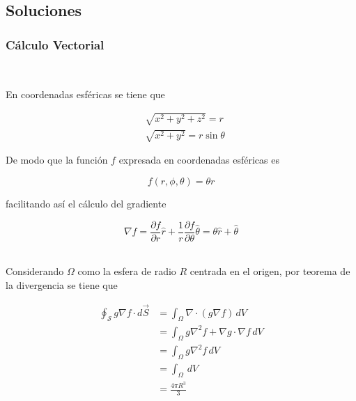 \subsection{Soluciones}

\subsubsection{Cálculo Vectorial}

\\
\bigbreak

En coordenadas esféricas se tiene que

\begin{equation}
\begin{split}
    &\sqrt{x^2+y^2+z^2}=r\\
    &\sqrt{x^2+y^2}= r\sin{\theta}
\end{split}
\nonumber
\end{equation}

De modo que la función $f$ expresada en coordenadas esféricas es

\[f(r,\phi,\theta)=\theta r\]

facilitando así el cálculo del gradiente

    \[\nabla f = \frac{\partial f}{\partial r}\hat{r}
    +\frac{1}{r}\frac{\partial f}{\partial \theta}\hat{\theta}=\theta\hat{r}+\hat{\theta}\]

\bigbreak
\bigbreak

\\
\bigbreak
Considerando $\Omega$ como la esfera de radio $R$ centrada en el origen, por teorema de la divergencia se tiene que

\begin{equation}
\begin{split}
    \oint_\mathcal{S} g\nabla f\cdot d\Vec{S}&=\int_\Omega
    \nabla\cdot\left(g\nabla f\right)\,dV\\
    &= \int_\Omega g\nabla^2 f+\nabla g\cdot\nabla f\,dV\\
    &= \int_\Omega g\nabla^2 f\,dV\\
    &= \int_\Omega\,dV\\
    &=\frac{4\pi R^3}{3}
\end{split}
\nonumber
\end{equation}

\newpage

\\
\bigbreak


